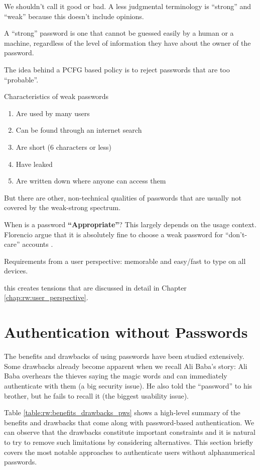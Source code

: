 We shouldn't call it good or bad. A less judgmental terminology is ``strong'' and ``weak'' because this doesn't include opinions. 

A ``strong'' password is one that cannot be guessed easily by a human or a machine, regardless of the level of information they have about the owner of the password. 


The idea behind a PCFG based policy is to reject passwords that are too ``probable''. 

Characteristics of weak passwords \cite{Burnett2005PerfectPasswords}
\begin{enumerate}
	\item Are used by many users
	\item Can be found through an internet search
	\item Are short (6 characters or less)
	\item Have leaked
	\item Are written down where anyone can access them
\end{enumerate}

But there are other, non-technical qualities of passwords that are usually not covered by the weak-strong spectrum. 

When is a password \textbf{``Appropriate''}? This largely depends on the usage context. \cite{Gaw2005ReuseRecycle, Haque2014Hierarchy}
Florencio \etal argue that it is absolutely fine to choose a weak password for ``don't-care'' accounts \cite{Florencio2014}.

Requirements from a user perspective: memorable and easy/fast to type on all devices.

this creates tensions that are discussed in detail in Chapter \ref{chap:rw:user_perspective}.


\section{Authentication without Passwords}\label{sec:rw:authentication_without_pws}
The benefits and drawbacks of using passwords have been studied extensively. Some drawbacks already become apparent when we recall Ali Baba's story: Ali Baba overhears the thieves saying the magic words and can immediately authenticate with them (a big security issue). He also told the ``password'' to his brother, but he fails to recall it (the biggest usability issue).

Table \ref{table:rw:benefits_drawbacks_pws} shows a high-level summary of the benefits and drawbacks that come along with password-based authentication. We can observe that the drawbacks constitute important constraints and it is natural to try to remove such limitations by considering alternatives. This section briefly covers the most notable approaches to authenticate users without alphanumerical passwords.

